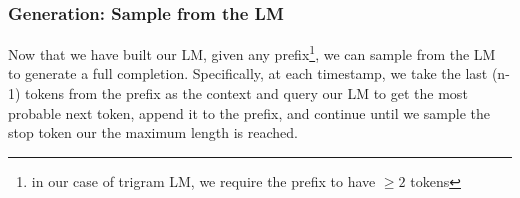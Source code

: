 \noindent{}

\subsubsection{Generation: Sample from the LM}
Now that we have built our LM, given any prefix\footnote{in our case of trigram LM, we require the prefix to have $\geq2$ tokens}, we can sample from the LM to generate a full completion. Specifically, at each timestamp, we take the last (n-1) tokens from the prefix as the context and query our LM to get the most probable next token, append it to the prefix, and continue until we sample the stop token our the maximum length is reached. 

